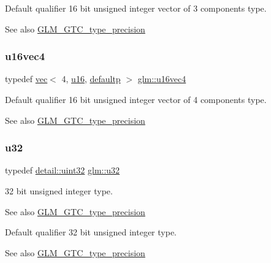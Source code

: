 Default qualifier 16 bit unsigned integer vector of 3 components type. \begin{DoxySeeAlso}{See also}
\hyperlink{group__gtc__type__precision}{G\+L\+M\+\_\+\+G\+T\+C\+\_\+type\+\_\+precision} 
\end{DoxySeeAlso}
\mbox{\label{group__gtc__type__precision_ga049d45ad8d0f78578d7ceb86a7fdaae4}} 
\subsubsection{\texorpdfstring{u16vec4}{u16vec4}}
{\footnotesize\ttfamily typedef \hyperlink{structglm_1_1vec}{vec}$<$ 4, \hyperlink{group__gtc__type__precision_gae7a1571503f83d2264ddfa705a6b082a}{u16}, \hyperlink{namespaceglm_a36ed105b07c7746804d7fdc7cc90ff25a9d21ccd8b5a009ec7eb7677befc3bf51}{defaultp} $>$ \hyperlink{group__gtc__type__precision_ga049d45ad8d0f78578d7ceb86a7fdaae4}{glm\+::u16vec4}}

Default qualifier 16 bit unsigned integer vector of 4 components type. \begin{DoxySeeAlso}{See also}
\hyperlink{group__gtc__type__precision}{G\+L\+M\+\_\+\+G\+T\+C\+\_\+type\+\_\+precision} 
\end{DoxySeeAlso}
\mbox{\label{group__gtc__type__precision_ga54e837745059fd29017bed71cfa0a8db}} 
\subsubsection{\texorpdfstring{u32}{u32}}
{\footnotesize\ttfamily typedef \hyperlink{namespaceglm_1_1detail_ade6cfbf377022aaa391af8cd50489222}{detail\+::uint32} \hyperlink{group__gtc__type__precision_ga54e837745059fd29017bed71cfa0a8db}{glm\+::u32}}

32 bit unsigned integer type. \begin{DoxySeeAlso}{See also}
\hyperlink{group__gtc__type__precision}{G\+L\+M\+\_\+\+G\+T\+C\+\_\+type\+\_\+precision}
\end{DoxySeeAlso}
Default qualifier 32 bit unsigned integer type. \begin{DoxySeeAlso}{See also}
\hyperlink{group__gtc__type__precision}{G\+L\+M\+\_\+\+G\+T\+C\+\_\+type\+\_\+precision} 
\end{DoxySeeAlso}
\mbox{\label{group__gtc__type__precision_ga99f64714ce341e34036bd10c8b36823a}} 
